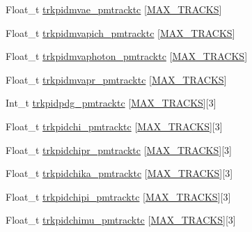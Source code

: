 \begin{DoxyCompactItemize}
\item 
Float\-\_\-t \hyperlink{classanatree_a48bc957c9c6188a3989b1d4aa504860d}{trkpidmvae\-\_\-pmtracktc} \mbox{[}\hyperlink{anatree__core__v09410002_8h_a327fd4e796e4a0d78947524c96e4362e}{M\-A\-X\-\_\-\-T\-R\-A\-C\-K\-S}\mbox{]}
\item 
Float\-\_\-t \hyperlink{classanatree_a4bff7ec858e1fe70ef59d8cb584ff6fb}{trkpidmvapich\-\_\-pmtracktc} \mbox{[}\hyperlink{anatree__core__v09410002_8h_a327fd4e796e4a0d78947524c96e4362e}{M\-A\-X\-\_\-\-T\-R\-A\-C\-K\-S}\mbox{]}
\item 
Float\-\_\-t \hyperlink{classanatree_a7852dd9ddd40910fcf22292953ab0a68}{trkpidmvaphoton\-\_\-pmtracktc} \mbox{[}\hyperlink{anatree__core__v09410002_8h_a327fd4e796e4a0d78947524c96e4362e}{M\-A\-X\-\_\-\-T\-R\-A\-C\-K\-S}\mbox{]}
\item 
Float\-\_\-t \hyperlink{classanatree_a54cbe0b7be68c4480faa489b0ade1c8c}{trkpidmvapr\-\_\-pmtracktc} \mbox{[}\hyperlink{anatree__core__v09410002_8h_a327fd4e796e4a0d78947524c96e4362e}{M\-A\-X\-\_\-\-T\-R\-A\-C\-K\-S}\mbox{]}
\item 
Int\-\_\-t \hyperlink{classanatree_a9e947d81c3dc2d0f00559e64032feddb}{trkpidpdg\-\_\-pmtracktc} \mbox{[}\hyperlink{anatree__core__v09410002_8h_a327fd4e796e4a0d78947524c96e4362e}{M\-A\-X\-\_\-\-T\-R\-A\-C\-K\-S}\mbox{]}\mbox{[}3\mbox{]}
\item 
Float\-\_\-t \hyperlink{classanatree_af314016c994fe3c3adf9b0cbb6de114c}{trkpidchi\-\_\-pmtracktc} \mbox{[}\hyperlink{anatree__core__v09410002_8h_a327fd4e796e4a0d78947524c96e4362e}{M\-A\-X\-\_\-\-T\-R\-A\-C\-K\-S}\mbox{]}\mbox{[}3\mbox{]}
\item 
Float\-\_\-t \hyperlink{classanatree_a035912a933489b468e7a28e1988a5835}{trkpidchipr\-\_\-pmtracktc} \mbox{[}\hyperlink{anatree__core__v09410002_8h_a327fd4e796e4a0d78947524c96e4362e}{M\-A\-X\-\_\-\-T\-R\-A\-C\-K\-S}\mbox{]}\mbox{[}3\mbox{]}
\item 
Float\-\_\-t \hyperlink{classanatree_a6b8dbf4d77dd24e6b9788c0e77773fe7}{trkpidchika\-\_\-pmtracktc} \mbox{[}\hyperlink{anatree__core__v09410002_8h_a327fd4e796e4a0d78947524c96e4362e}{M\-A\-X\-\_\-\-T\-R\-A\-C\-K\-S}\mbox{]}\mbox{[}3\mbox{]}
\item 
Float\-\_\-t \hyperlink{classanatree_a124a40e7067d538954f04454014137e2}{trkpidchipi\-\_\-pmtracktc} \mbox{[}\hyperlink{anatree__core__v09410002_8h_a327fd4e796e4a0d78947524c96e4362e}{M\-A\-X\-\_\-\-T\-R\-A\-C\-K\-S}\mbox{]}\mbox{[}3\mbox{]}
\item 
Float\-\_\-t \hyperlink{classanatree_aeca26db80918f6dd7103dd1889aa09e8}{trkpidchimu\-\_\-pmtracktc} \mbox{[}\hyperlink{anatree__core__v09410002_8h_a327fd4e796e4a0d78947524c96e4362e}{M\-A\-X\-\_\-\-T\-R\-A\-C\-K\-S}\mbox{]}\mbox{[}3\mbox{]}

\end{DoxyCompactItemize}
